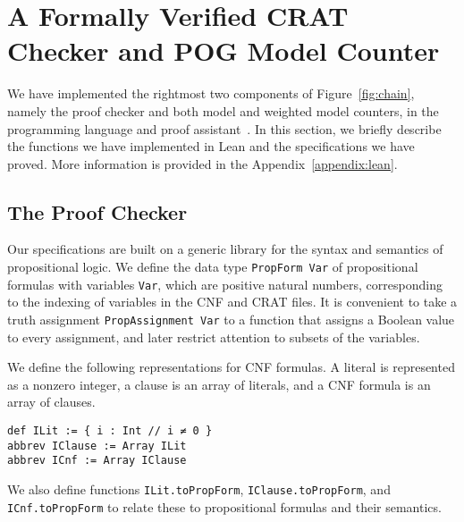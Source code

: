 \section{A Formally Verified CRAT Checker and POG Model Counter}

We have implemented the rightmost two components of Figure~\ref{fig:chain}, namely the
proof checker and both model and weighted model counters, in the \lean{} programming language
and proof assistant~\cite{demoura:cade:2021}.
In this section, we briefly describe the functions we have implemented in Lean and
the specifications we have proved.
More information is provided in the Appendix~\ref{appendix:lean}.

\subsection{The Proof Checker}
\label{subsection:proof:checker}

Our specifications are built on a generic library for the syntax and semantics of
propositional logic. We define the data type \lstinline{PropForm Var} of propositional
formulas with variables \lstinline{Var}, which are positive natural numbers,
corresponding to the indexing of variables in the CNF and CRAT files.
It is convenient to take a truth assignment \lstinline{PropAssignment Var} to a function that
assigns a Boolean value to every assignment, and later restrict attention to subsets of the
variables.

We define the following representations for CNF formulas.
A literal is represented as a nonzero integer, a clause is an array of literals,
and a CNF formula is an array of clauses.
\begin{lstlisting}
def ILit := { i : Int // i ≠ 0 }
abbrev IClause := Array ILit
abbrev ICnf := Array IClause
\end{lstlisting}
We also define functions \lstinline{ILit.toPropForm}, \lstinline{IClause.toPropForm},
and \lstinline{ICnf.toPropForm} to relate these to propositional formulas and their
semantics.

